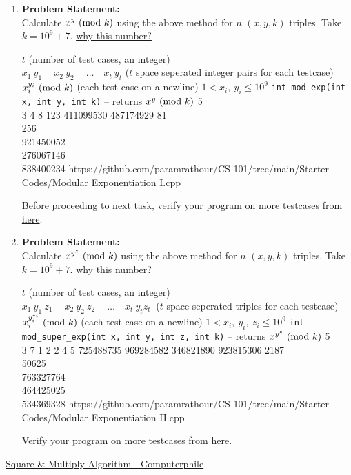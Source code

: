 \documentclass[../../Problems]{subfiles}
\begin{document}
\begin{enumerate}[label=(\alph*)]
\item 
\textbf{Problem Statement:}\\
Calculate $x^y\ (\mathrm{mod}\ k)$ using the above method for $n$ $(x,y,k)$ triples. Take $k=10^9+7$. \href{https://www.geeksforgeeks.org/modulo-1097-1000000007/}{why this number?}
\begin{testcasesFunction}
	{$t$ \hfill(number of test cases, an integer)\\
	$x_1\ y_1\ \quad x_2\ y_2\ \quad \ldots\quad x_t\ y_t$ \hfill($t$ space seperated integer pairs for each testcase)}
	{$x_i^{y_i} \ (\mathrm{mod}\ k)$ \hfill(each test case on a newline)}
	{$1 < x_i,\ y_i \leq 10^{9}$}
	{\texttt{int mod\_exp(int x, int y, int k)} -- returns $x^y \ (\mathrm{mod}\ k)$}
	{5\\3 4 8 123 411099530 487174929}
	{81\\256\\921450052\\276067146\\838400234}
	{https://github.com/paramrathour/CS-101/tree/main/Starter Codes/Modular Exponentiation I.cpp}
\end{testcasesFunction}
\begin{note}
	Before proceeding to next task, verify your program on more testcases from \href{https://cses.fi/problemset/task/1095}{here}.
\end{note}
\item 
\textbf{Problem Statement:}\\
Calculate $x^{y^z}\ (\mathrm{mod}\ k)$ using the above method for $n$ $(x,y,k)$ triples. Take $k=10^9+7$. \href{https://www.geeksforgeeks.org/modulo-1097-1000000007/}{why this number?}
\begin{testcasesFunction}
	{$t$ \hfill(number of test cases, an integer)\\
	$x_1\ y_1\ z_1\ \quad x_2\ y_2\ z_2\ \quad \ldots\quad x_t\ y_t z_t\ $ \hfill($t$ space seperated triples for each testcase)}
	{$x_i^{y_{i}^{z_i}} \ (\mathrm{mod}\ k)$ \hfill(each test case on a newline)}
	{$1 < x_i,\ y_i,\ z_i \leq 10^{9}$}
	{\texttt{int mod\_super\_exp(int x, int y, int z, int k)} -- returns $x^{y^z} \ (\mathrm{mod}\ k)$}
	{5\\3 7 1 2 2 4 5 725488735 969284582 346821890 923815306}
	{2187\\50625\\763327764\\464425025\\534369328}
	{https://github.com/paramrathour/CS-101/tree/main/Starter Codes/Modular Exponentiation II.cpp}
\end{testcasesFunction}
\begin{note}
	Verify your program on more testcases from \href{https://cses.fi/problemset/task/1712}{here}.
\end{note}
\end{enumerate}
\begin{funvideo}
\href{https://youtu.be/cbGB__V8MNk}{Square \& Multiply Algorithm - Computerphile}
\end{funvideo}
\recalctypearea
\end{document}
